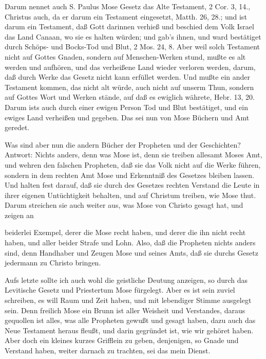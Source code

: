 Darum nennet auch S. Paulus Mose Gesetz das Alte Testament, 2 Cor. 3, 14., Christus auch, da er darum ein Testament eingesetzt, Matth. 26, 28.; und ist darum ein Testament, daß Gott darinnen verhieß und beschied dem Volk Israel das Land Canaan, wo sie es halten würden; und gab's ihnen, und ward bestätiget durch Schöps- und Bocks-Tod und Blut, 2 Mos. 24, 8. Aber weil solch Testament nicht auf Gottes Gnaden, sondern auf Menschen-Werken stund, mußte es alt werden und aufhören, und das verheißene Land wieder verloren werden, darum, daß durch Werke das Gesetz nicht kann erfüllet werden. Und mußte ein ander Testament kommen, das nicht alt würde, auch nicht auf unserm Thun, sondern auf Gottes Wort und Werken stände, auf daß es ewiglich währete, Hebr. 13, 20. Darum ists auch durch einer ewigen Person Tod und Blut bestätiget, und ein ewiges Land verheißen und gegeben. Das sei nun von Mose Büchern und Amt geredet.

Was sind aber nun die andern Bücher der Propheten und der Geschichten? Antwort: Nichts anders, denn was Mose ist, denn sie treiben allesamt Moses Amt, und wehren den falschen Propheten, daß sie das Volk nicht auf die Werke führen, sondern in dem rechten Amt Mose und Erkenntniß des Gesetzes bleiben lassen. Und halten fest darauf, daß sie durch des Gesetzes rechten Verstand die Leute in ihrer eigenen Untüchtigkeit behalten, und auf Christum treiben, wie Mose thut. Darum streichen sie auch weiter aus, was Mose von Christo gesagt hat, und zeigen an


beiderlei Exempel, derer die Mose recht haben, und derer die ihn nicht recht haben, und aller beider Strafe und Lohn. Also, daß die Propheten nichts anders sind, denn Handhaber und Zeugen Mose und seines Amts, daß sie durchs Gesetz jedermann zu Christo bringen.

Aufs letzte sollte ich auch wohl die geistliche Deutung anzeigen, so durch das Levitische Gesetz und Priestertum Mose fürgelegt. Aber es ist sein zuviel schreiben, es will Raum und Zeit haben, und mit lebendiger Stimme ausgelegt sein. Denn freilich Mose ein Brunn ist aller Weisheit und Verstandes, daraus gequollen ist alles, was alle Propheten gewußt und gesagt haben, dazu auch das Neue Testament heraus fleußt, und darin gegründet ist, wie wir gehöret haben. Aber doch ein kleines kurzes Grifflein zu geben, denjenigen, so Gnade und Verstand haben, weiter darnach zu trachten, sei das mein Dienst.

